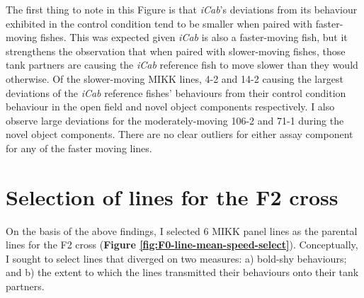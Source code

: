 \documentclass[
]{book}
\begin{document}
The first thing to note in this Figure is that \emph{\textcolor{iCab_424B4D}{iCab}}'s deviations from its behaviour exhibited in the control condition tend to be smaller when paired with faster-moving fishes. This was expected given \emph{\textcolor{iCab_424B4D}{iCab}} is also a faster-moving fish, but it strengthens the observation that when paired with slower-moving fishes, those tank partners are causing the \emph{\textcolor{iCab_424B4D}{iCab}} reference fish to move slower than they would otherwise. Of the slower-moving MIKK lines, \textcolor{4-2_FC61D4}{4-2} and \textcolor{14-2_F066EA}{14-2} causing the largest deviations of the \emph{\textcolor{iCab_424B4D}{iCab}} reference fishes' behaviours from their control condition behaviour in the open field and novel object components respectively. I also observe large deviations for the moderately-moving \textcolor{106-2_00B9E3}{106-2} and \textcolor{71-1_00BECD}{71-1} during the novel object components. There are no clear outliers for either assay component for any of the faster moving lines.

\hypertarget{selection-of-lines-for-the-f2-cross}{%
\section{Selection of lines for the F2 cross}\label{selection-of-lines-for-the-f2-cross}}

On the basis of the above findings, I selected 6 MIKK panel lines as the parental lines for the F2 cross (\textbf{Figure \ref{fig:F0-line-mean-speed-select}}). Conceptually, I sought to select lines that diverged on two measures: a) bold-shy behaviours; and b) the extent to which the lines transmitted their behaviours onto their tank partners.
\end{document}
